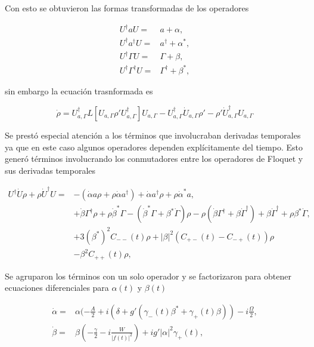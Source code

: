 \documentclass[11pt]{beamer}
\begin{document}
\begin{frame}
Con esto se obtuvieron las formas transformadas de los operadores

\begin{align}
U^{\dagger} a U =& a + \alpha, \\
U^{\dagger} a^{\dagger} U =& a^{\dagger} + \alpha^*, \\
U^{\dagger} \Gamma U =& \Gamma + \beta, \\
U^{\dagger} \Gamma^{\dagger} U =& \Gamma^{\dagger} + \beta^*, 
\end{align} 

sin embargo la ecuación trasnformada es

\begin{equation}
\dot{\rho} = U_{a,\Gamma}^\dagger L[U_{a,\Gamma} \rho' U_{a,\Gamma}^\dagger]U_{a,\Gamma}-U_{a,\Gamma}^\dagger\dot{U}_{a,\Gamma}\rho'-\rho'\dot{U}_{a,\Gamma}^\dagger U_{a,\Gamma}
\end{equation}

\end{frame}

\begin{frame}
Se prestó especial atención a los términos que involucraban derivadas temporales ya que en este caso algunos operadores dependen explícitamente del tiempo. Esto generó términos involucrando los conmutadores entre los operadores de Floquet y sus derivadas temporales

\begin{align*}
U^{\dagger}\dot{U}\rho + \rho \dot{U}^\dagger U =& -(\dot{\alpha}a \rho + \rho\dot{\alpha}a^{\dagger}) + \dot{\alpha}a^{\dagger}\rho + \rho \dot{\alpha}^*a,\\
&+ \dot{\beta}\Gamma^{\dagger}\rho + \rho\dot{\beta}^*\Gamma-(\dot{\beta}^*\Gamma + \beta^*\dot{\Gamma})\rho - \rho(\dot{\beta} \Gamma^{\dagger} + \beta \dot{\Gamma}^{\dagger}) +\beta \dot{\Gamma}^{\dagger} + \rho\beta^* \dot{\Gamma},\\
&+3(\beta^*)^2C_{--}(t)\rho + |\beta|^2(C_{+-}(t) - C_{-+}(t))\rho \\
&-  \beta^2 C_{++}(t)\rho,
\end{align*}
\end{frame}

\begin{frame}
Se agruparon los términos con un solo operador y se factorizaron para obtener ecuaciones diferenciales para $\alpha(t)$ y $\beta(t)$

\begin{align}
\dot{\alpha} =& \alpha(-\frac{A}{2}+i(\delta+g'(\gamma_-(t) \beta^* + \gamma_+(t) \beta))-i\frac{\Omega}{2},\\
\dot{\beta} =& \beta(-\frac{\gamma}{2}-i\frac{W}{|f(t)|^2})+ig'|\alpha|^2\gamma_+(t),
\end{align}


\end{frame}
\end{document}
